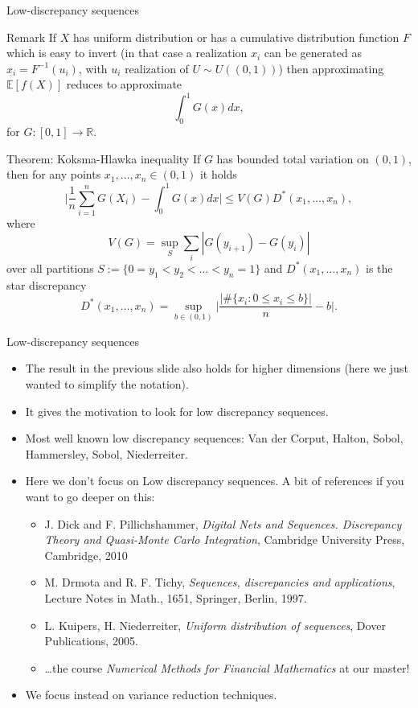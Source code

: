 \documentclass[9 pt]{beamer} %
\begin{document}
\begin{frame}{Low-discrepancy sequences}
\small{
\begin{block}{Remark} 
 If $X$ has uniform distribution or has a cumulative distribution function $F$ which is easy to invert (in that case a realization $x_i$ can be generated as $x_i=F^{-1}(u_i)$, with $u_i$ realization of $U \sim U((0,1))$) then approximating $ \mathbb{E}[f(X)]$ reduces to approximate
 \begin{equation}\label{eq:integral}
\int_0^1 G(x)dx, 
 \end{equation} 
 for $G:[0,1] \to \mathbb{R}$.
 \end{block}
 \begin{block}{Theorem: Koksma-Hlawka inequality}
 If $G$ has bounded total variation on $(0,1)$, then for any points $x_1, \dots, x_n  \in (0,1)$ it holds
 $$
 \bigg| \frac{1}{n} \sum_{i=1}^n G(X_i) -  \int_0^1 G(x)dx \bigg| \le V(G)D^*(x_1, \dots, x_n),
 $$
 where 
 $$
 V(G)=\sup_S \sum_i|G(y_{i+1})-G(y_i)|
 $$
 over all partitions $S:= \{0=y_1<y_2<\dots<y_n=1\}$ and $D^*(x_1, \dots, x_n)$ is the star discrepancy
 $$
 D^*(x_1, \dots, x_n) = \sup_{b \in (0,1)} \Big| \frac{|\#\{x_i: 0 \le x_i \le b\}|}{n}  - b \Big|.
 $$
 \end{block}}
\end{frame} 

\begin{frame}{Low-discrepancy sequences}
\begin{itemize}
\item The result in the previous slide also holds for higher dimensions  (here we just wanted to simplify the notation).
\item It gives the motivation to look for low discrepancy sequences. 
\item Most well known low discrepancy sequences: Van der Corput, Halton, Sobol, Hammersley, Sobol, Niederreiter.
\item Here we don't focus on Low discrepancy sequences. A bit of references if you want to go deeper on this: 
\begin{itemize}
\item J. Dick and F. Pillichshammer, \emph{Digital Nets and Sequences. Discrepancy Theory and Quasi-Monte Carlo Integration}, Cambridge University Press, Cambridge, 2010
\item M. Drmota and R. F. Tichy, \emph{Sequences, discrepancies and applications}, Lecture Notes in Math., 1651, Springer, Berlin, 1997.
\item L. Kuipers,  H. Niederreiter, \emph{Uniform distribution of sequences}, Dover Publications, 2005.
\item \dots the course \emph{Numerical Methods for Financial Mathematics} at our master!
\end{itemize}
\item We focus instead on variance reduction techniques.
\end{itemize}
\end{frame} 
\end{document}
